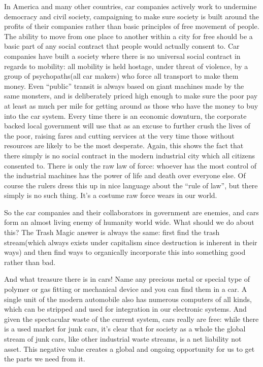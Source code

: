 In America and many other countries, car companies actively work to
undermine democracy and civil society, campaigning to make sure society
is built around the profits of their companies rather than basic
principles of free movement of people. The ability to move from one
place to another within a city for free should be a basic part of any
social contract that people would actually consent to. Car companies
have built a society where there is no universal social contract in
regards to mobility: all mobility is held hostage, under threat of
violence, by a group of psychopaths(all car makers) who force all
transport to make them money. Even ``public'' transit is always based on
giant machines made by the same monsters, and is deliberately priced
high enough to make sure the poor pay at least as much per mile for
getting around as those who have the money to buy into the car system.
Every time there is an economic downturn, the corporate backed local
government will use that as an excuse to further crush the lives of the
poor, raising fares and cutting services at the very time those without
resources are likely to be the most desperate. Again, this shows the
fact that there simply is no social contract in the modern industrial
city which all citizens consented to. There is only the raw law of
force: whoever has the most control of the industrial machines has the
power of life and death over everyone else. Of course the rulers dress
this up in nice language about the ``rule of law'', but there simply is
no such thing. It's a costume raw force wears in our world.

So the car companies and their collaborators in government are enemies,
and cars form an almost living enemy of humanity world wide. What should
we do about this? The Trash Magic answer is always the same: first find
the trash stream(which always exists under capitalism since destruction
is inherent in their ways) and then find ways to organically incorporate
this into something good rather than bad.

And what treasure there is in cars! Name any precious metal or special
type of polymer or gas fitting or mechanical device and you can find
them in a car. A single unit of the modern automobile also has numerous
computers of all kinds, which can be stripped and used for integration
in our electronic systems. And given the spectacular waste of the
current system, cars really are free: while there is a used market for
junk cars, it's clear that for society as a whole the global stream of
junk cars, like other industrial waste streams, is a net liability not
asset. This negative value creates a global and ongoing opportunity for
us to get the parts we need from it.

